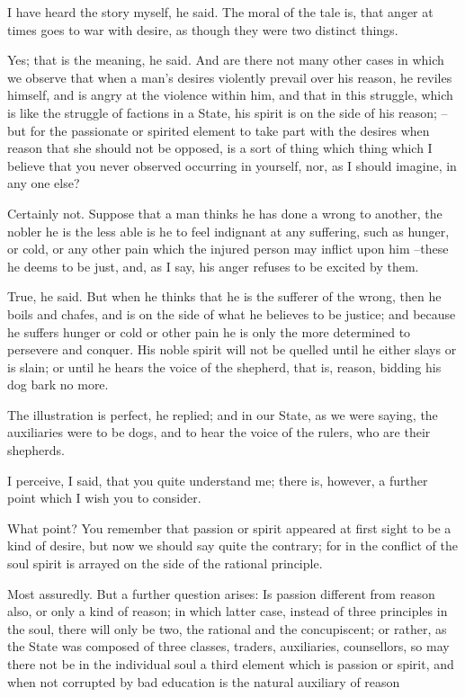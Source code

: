 I have heard the story myself, he said.
The moral of the tale is, that anger at times goes to war with desire, as though they were two distinct things.

Yes; that is the meaning, he said.
And are there not many other cases in which we observe that when a man's desires violently prevail over his reason, he reviles himself, and is angry at the violence within him, and that in this struggle, which is like the struggle of factions in a State, his spirit is on the side of his reason; --but for the passionate or spirited element to take part with the desires when reason that she should not be opposed, is a sort of thing which thing which I believe that you never observed occurring in yourself, nor, as I should imagine, in any one else?

Certainly not.
Suppose that a man thinks he has done a wrong to another, the nobler he is the less able is he to feel indignant at any suffering, such as hunger, or cold, or any other pain which the injured person may inflict upon him --these he deems to be just, and, as I say, his anger refuses to be excited by them.

True, he said.
But when he thinks that he is the sufferer of the wrong, then he boils and chafes, and is on the side of what he believes to be justice; and because he suffers hunger or cold or other pain he is only the more determined to persevere and conquer. His noble spirit will not be quelled until he either slays or is slain; or until he hears the voice of the shepherd, that is, reason, bidding his dog bark no more.

The illustration is perfect, he replied; and in our State, as we were saying, the auxiliaries were to be dogs, and to hear the voice of the rulers, who are their shepherds.

I perceive, I said, that you quite understand me; there is, however, a further point which I wish you to consider.

What point?
You remember that passion or spirit appeared at first sight to be a kind of desire, but now we should say quite the contrary; for in the conflict of the soul spirit is arrayed on the side of the rational principle.

Most assuredly.
But a further question arises: Is passion different from reason also, or only a kind of reason; in which latter case, instead of three principles in the soul, there will only be two, the rational and the concupiscent; or rather, as the State was composed of three classes, traders, auxiliaries, counsellors, so may there not be in the individual soul a third element which is passion or spirit, and when not corrupted by bad education is the natural auxiliary of reason


